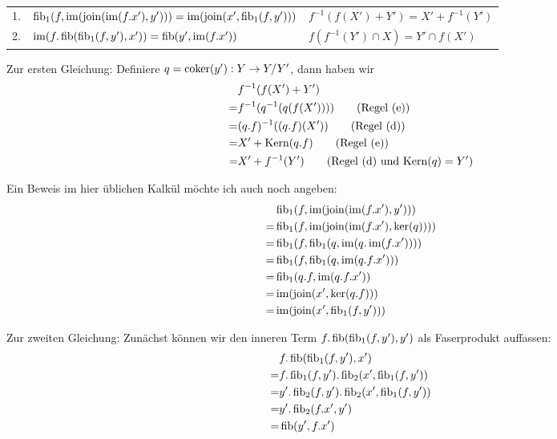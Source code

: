 \begin{lemm}
\ \linebreak %

\begin{tabular}{rll}
   1.
&  $\fib_1(f,\im(\join(\im(f.x'),y'))) = \im(\join(x',\fib_1(f,y')))$
&  $f^{-1}(f(X')+Y') = X' + f^{-1}(Y')$
\\ 2.
&  $\im(f.\fib(\fib_1(f,y'),x')) = \fib(y',\im(f.x'))$
&  $f(f^{-1}(Y')\cap X) = Y' \cap f(X')$
\end{tabular}
\end{lemm}
\begin{bew}

Zur ersten Gleichung:
Definiere $q = \coker(y') : Y \to Y/Y'$, dann haben wir
\begin{align*}
   & f^{-1}(f(X') + Y')
\\=& f^{-1}(q^{-1}(q(f(X')))) \qquad \text{(Regel (e))}
\\=& (q.f)^{-1}((q.f)(X')) \qquad \text{(Regel (d))}
\\=& X' + \Kern(q.f) \qquad\text{(Regel (e))}
\\=& X' + f^{-1}(Y') \qquad\text{(Regel (d) und $\Kern(q) = Y'$)}
\end{align*}

Ein Beweis im hier üblichen Kalkül möchte ich auch noch angeben:
\begin{align*}
   & \fib_1(f, \im(\join(\im(f.x'),y')))
\\=& \fib_1(f, \im(\join(\im(f.x'),\ker(q))))
\\=& \fib_1(f, \fib_1(q,\im(q.\im(f.x'))))
\\=& \fib_1(f, \fib_1(q,\im(q.f.x')))
\\=& \fib_1(q.f, \im(q.f.x'))
\\=& \im(\join(x',\ker(q.f)))
\\=& \im(\join(x',\fib_1(f,y')))
\end{align*}

Zur zweiten Gleichung:
Zunächst können wir den inneren Term $f.\fib(\fib_1(f,y'),y')$ als Faserprodukt auffassen:
\begin{align*}
   & f.\fib(\fib_1(f,y'),x')
\\=& f.\fib_1(f,y').\fib_2(x',\fib_1(f,y'))
\\=& y'.\fib_2(f,y').\fib_2(x',\fib_1(f,y'))
\\=& y'.\fib_2(f.x',y')
\\=& \fib(y',f.x')
\end{align*}


\end{bew}
